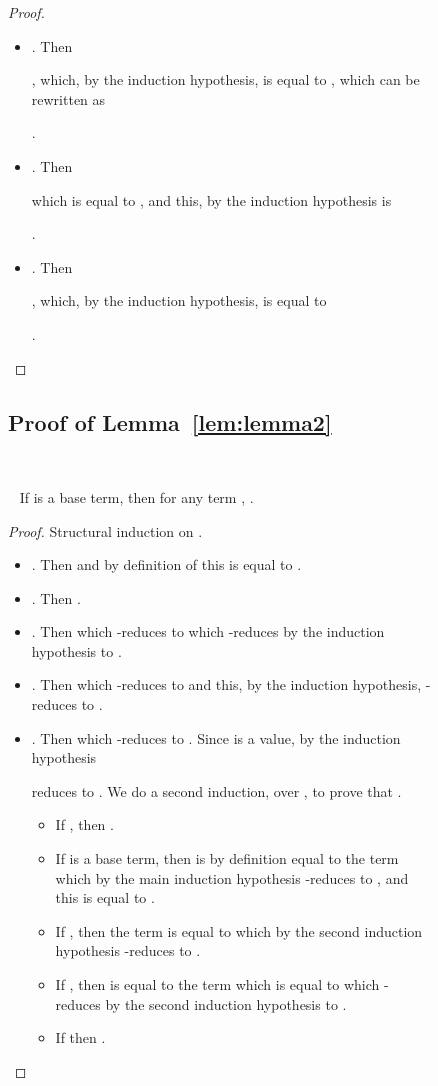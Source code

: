 \documentclass{LMCS}
\newcommand{\recap}[2]{\medskip\noindent{\bf #1 \ref{#2}.}~}
\begin{document}
\begin{figure}
{\begin{proof}
\begin{itemize}
      
      , 
      which by the induction hypothesis is 
      
      
      .
    \item . Then
      
      \!
      \!
      ,
      which, by the induction hypothesis, is equal to
      ,
      which can be rewritten as
      
      
      .
    \item . Then 
      
      
      
      which is equal to
      ,
      and this, by the induction hypothesis is
      
      
      
      .
    \item . Then 
      
      \!
      \!
      ,
      which, by the induction hypothesis, is equal to
      
      \!
      
      .
      \qedhere
  \end{itemize}
\end{proof}

\subsection{Proof of Lemma~\ref{lem:lemma2}}\label{proof:lemma2}~

\recap{Lemma}{lem:lemma2}
If  is a base term, then for any term , .
\begin{proof}
  Structural induction on .
  \begin{itemize}
    \item . Then  and by definition of  this is equal to .
    \item . Then .
    \item . Then  which -reduces to   which -reduces by the induction hypothesis to .
    \item . Then  which -reduces to  and this, by the induction hypothesis, -reduces to . 
    \item . Then  which -reduces to . 
      Since  is a value, by the induction hypothesis 
      
      reduces to .
      We do a second induction, over , to prove that .
      \begin{itemize} 
	\item If , then .
	\item If  is a base term, then  is by definition equal to the term   which by the main induction hypothesis -reduces to  , and this is equal to .
	\item If , then the term  is equal to  which by the second induction hypothesis -reduces to .
	\item If , then  is equal to the term  which is equal to  which -reduces by the second induction hypothesis to .
	\item If  then .\qedhere
      \end{itemize}
  \end{itemize}
\end{proof}

}
\end{figure}
\end{document}
